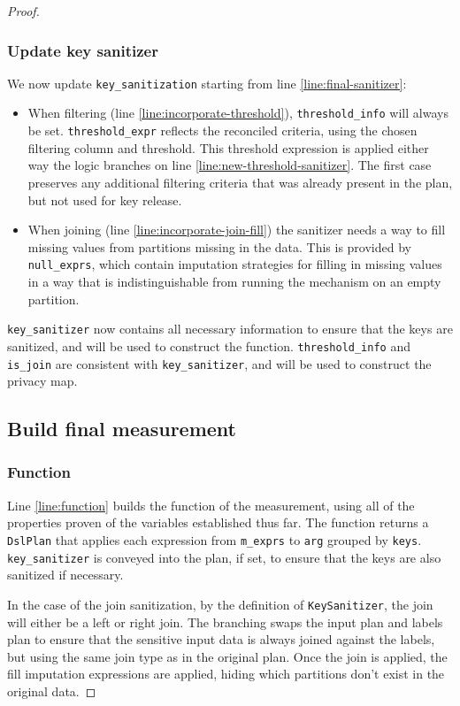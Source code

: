 \documentclass{article}
\begin{document}
\begin{proof}
\subsubsection{Update key sanitizer}
We now update \texttt{key\_sanitization} starting from line \ref{line:final-sanitizer}:
\begin{itemize}
    \item When filtering (line \ref{line:incorporate-threshold}), \texttt{threshold\_info} will always be set. 
    \texttt{threshold\_expr} reflects the reconciled criteria, using the chosen filtering column and threshold. 
    This threshold expression is applied either way the logic branches on line \ref{line:new-threshold-sanitizer}.
    The first case preserves any additional filtering criteria that was already present in the plan, but not used for key release.
    \item When joining (line \ref{line:incorporate-join-fill}) the sanitizer needs a way to fill missing values from partitions missing in the data.
    This is provided by \texttt{null\_exprs}, which contain imputation strategies for filling in missing values 
    in a way that is indistinguishable from running the mechanism on an empty partition.
\end{itemize}

\texttt{key\_sanitizer} now contains all necessary information to ensure that the keys are sanitized, 
and will be used to construct the function.
\texttt{threshold\_info} and \texttt{is\_join} are consistent with \texttt{key\_sanitizer}, 
and will be used to construct the privacy map.

\subsection{Build final measurement}
\subsubsection{Function}
Line \ref{line:function} builds the function of the measurement,
using all of the properties proven of the variables established thus far.
The function returns a \texttt{DslPlan} that applies each expression from \texttt{m\_exprs}
to \texttt{arg} grouped by \texttt{keys}.
\texttt{key\_sanitizer} is conveyed into the plan, if set, 
to ensure that the keys are also sanitized if necessary.

In the case of the join sanitization, by the definition of \texttt{KeySanitizer},
the join will either be a left or right join.
The branching swaps the input plan and labels plan to ensure that the sensitive input data is always joined against the labels,
but using the same join type as in the original plan.
Once the join is applied, the fill imputation expressions are applied, hiding which partitions don't exist in the original data.


\end{proof}
\end{document}

